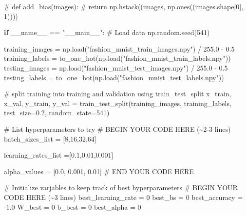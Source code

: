 \documentclass[
  letterpaper,
  DIV=11,
  numbers=noendperiod]{scrartcl}
\newenvironment{Shaded}{\begin{snugshade}}{\end{snugshade}}
\newcommand{\CommentTok}[1]{\textcolor[rgb]{0.37,0.37,0.37}{#1}}
\newcommand{\ControlFlowTok}[1]{\textcolor[rgb]{0.00,0.23,0.31}{\textbf{#1}}}
\newcommand{\DecValTok}[1]{\textcolor[rgb]{0.68,0.00,0.00}{#1}}
\newcommand{\FloatTok}[1]{\textcolor[rgb]{0.68,0.00,0.00}{#1}}
\newcommand{\NormalTok}[1]{\textcolor[rgb]{0.00,0.23,0.31}{#1}}
\newcommand{\OperatorTok}[1]{\textcolor[rgb]{0.37,0.37,0.37}{#1}}
\newcommand{\RegionMarkerTok}[1]{\textcolor[rgb]{0.00,0.23,0.31}{#1}}
\newcommand{\StringTok}[1]{\textcolor[rgb]{0.13,0.47,0.30}{#1}}
\newcommand{\VariableTok}[1]{\textcolor[rgb]{0.07,0.07,0.07}{#1}}
\begin{document}
\begin{Shaded}
\begin{Highlighting}[]
\CommentTok{\# def add\_bias(images):}
\CommentTok{\#     return np.hstack((images, np.ones((images.shape[0], 1))))}

\ControlFlowTok{if} \VariableTok{\_\_name\_\_} \OperatorTok{==} \StringTok{"\_\_main\_\_"}\NormalTok{:}
    \CommentTok{\# Load data}
\NormalTok{    np.random.seed(}\DecValTok{541}\NormalTok{) }
    
\NormalTok{    training\_images }\OperatorTok{=}\NormalTok{ np.load(}\StringTok{"fashion\_mnist\_train\_images.npy"}\NormalTok{) }\OperatorTok{/} \FloatTok{255.0} \OperatorTok{{-}} \FloatTok{0.5}
\NormalTok{    training\_labels }\OperatorTok{=}\NormalTok{ to\_one\_hot(np.load(}\StringTok{"fashion\_mnist\_train\_labels.npy"}\NormalTok{))}
\NormalTok{    testing\_images }\OperatorTok{=}\NormalTok{ np.load(}\StringTok{"fashion\_mnist\_test\_images.npy"}\NormalTok{) }\OperatorTok{/} \FloatTok{255.0} \OperatorTok{{-}} \FloatTok{0.5}
\NormalTok{    testing\_labels }\OperatorTok{=}\NormalTok{ to\_one\_hot(np.load(}\StringTok{"fashion\_mnist\_test\_labels.npy"}\NormalTok{))}

    \CommentTok{\# split training into training and validation using train\_test\_split}
\NormalTok{    x\_train, x\_val, y\_train, y\_val }\OperatorTok{=}\NormalTok{ train\_test\_split(training\_images, training\_labels,}
\NormalTok{                                                      test\_size}\OperatorTok{=}\FloatTok{0.2}\NormalTok{, random\_state}\OperatorTok{=}\DecValTok{541}\NormalTok{)}

    \CommentTok{\# List hyperparameters to try}
    \CommentTok{\# }\RegionMarkerTok{BEGIN}\CommentTok{ YOUR CODE HERE (\textasciitilde{}2{-}3 lines)}
\NormalTok{    batch\_sizes\_list }\OperatorTok{=}\NormalTok{ [}\DecValTok{8}\NormalTok{,}\DecValTok{16}\NormalTok{,}\DecValTok{32}\NormalTok{,}\DecValTok{64}\NormalTok{]}

\NormalTok{    learning\_rates\_list }\OperatorTok{=}\NormalTok{[}\FloatTok{0.1}\NormalTok{,}\FloatTok{0.01}\NormalTok{,}\FloatTok{0.001}\NormalTok{]}

\NormalTok{    alpha\_values }\OperatorTok{=}\NormalTok{ [}\FloatTok{0.0}\NormalTok{, }\FloatTok{0.001}\NormalTok{, }\FloatTok{0.01}\NormalTok{]}
    \CommentTok{\# }\RegionMarkerTok{END}\CommentTok{ YOUR CODE HERE}

    \CommentTok{\# Initialize varjables to keep track of best hyperparameters}
    \CommentTok{\# }\RegionMarkerTok{BEGIN}\CommentTok{ YOUR CODE HERE (\textasciitilde{}3 lines)}
\NormalTok{    best\_learning\_rate }\OperatorTok{=} \DecValTok{0}
\NormalTok{    best\_bs }\OperatorTok{=} \DecValTok{0}
\NormalTok{    best\_accuracy }\OperatorTok{=} \OperatorTok{{-}}\FloatTok{1.0} 
\NormalTok{    W\_best }\OperatorTok{=} \DecValTok{0}
\NormalTok{    b\_best }\OperatorTok{=} \DecValTok{0}
\NormalTok{    best\_alpha }\OperatorTok{=} \DecValTok{0}



\end{Highlighting}
\end{Shaded}
\end{document}
